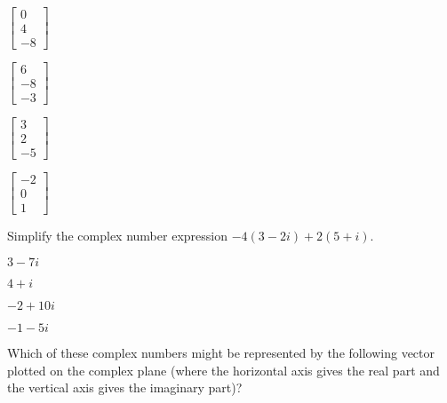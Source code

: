 \documentclass{article}
\begin{document}
\begin{readinessAssuranceTest}
\begin{multicols}{4}
\begin{readinessAssuranceTestChoices}
\item \(
        \begin{bmatrix}
          0 \\ 4 \\ -8
        \end{bmatrix}
      \) %
\item \(
        \begin{bmatrix}
          6 \\ -8 \\ -3
        \end{bmatrix}
      \)
\item \(
        \begin{bmatrix}
          3 \\ 2 \\ -5
        \end{bmatrix}
      \)
\item \(
        \begin{bmatrix}
          -2 \\ 0 \\ 1
        \end{bmatrix}
      \)
\end{readinessAssuranceTestChoices}
\end{multicols}

\item Simplify the complex number expression
      \(-4(3-2i)+2(5+i)\).

\begin{multicols}{4}
\begin{readinessAssuranceTestChoices}
\item \(3-7i\)
\item \(4+i\)
\item \(-2+10i\) %
\item \(-1-5i\)
\end{readinessAssuranceTestChoices}
\end{multicols}

\item Which of these complex numbers might be represented
      by the following vector
      plotted on the complex plane (where the horizontal axis gives the
      real part and the vertical axis gives the imaginary part)?

      \begin{center}
      \end{center}


\end{readinessAssuranceTest}
\end{document}
